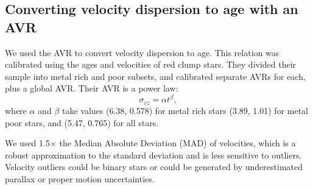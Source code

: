 \subsection{Converting velocity dispersion to age with an AVR}
\label{sec:avr}
We used the \citet{yu2018} AVR to convert velocity dispersion to age.
This relation was calibrated using the ages and velocities of red clump stars.
They divided their sample into metal rich and poor subsets, and calibrated
separate AVRs for each, plus a global AVR.
Their AVR is a power law:
\begin{equation}
    \sigma_{vz} = \alpha t ^\beta,
\end{equation}
where $\alpha$ and $\beta$ take values (6.38, 0.578) for metal rich stars
(3.89, 1.01) for metal poor stars, and (5.47, 0.765) for all stars.

We used 1.5$\times$ the Median Absolute Deviation (MAD) of velocities, which
is a robust approximation to the standard deviation and is less sensitive to
outliers.
Velocity outliers could be binary stars or could be generated by
underestimated parallax or proper motion uncertainties.
